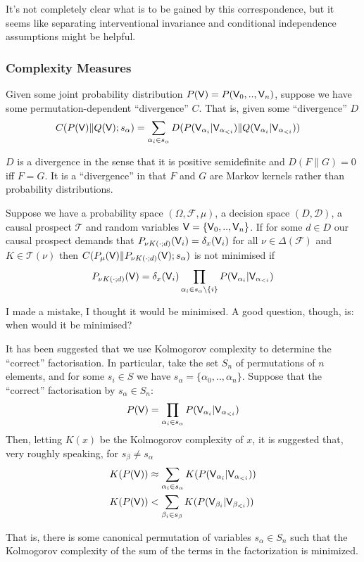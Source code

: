 It's not completely clear what is to be gained by this correspondence, but it seems like separating interventional invariance and conditional independence assumptions might be helpful.

\subsubsection{Complexity Measures}

Given some joint probability distribution $P(\mathsf{V})=P(\mathsf{V}_0,..,\mathsf{V}_n)$, suppose we have some permutation-dependent ``divergence'' $C$. That is, given some ``divergence'' $D$
\begin{align}
    C(P(\mathsf{V})\|Q(\mathsf{V});s_\alpha) &= \sum_{\alpha_i\in s_\alpha} D(P(\mathsf{V}_{\alpha_i}|\mathsf{V}_{\alpha_{<i}})\|Q(\mathsf{V}_{\alpha_i}|\mathsf{V}_{\alpha_{<i}}))
\end{align}

$D$ is a divergence in the sense that it is positive semidefinite and $D(F\|G)=0$ iff $F=G$. It is a ``divergence'' in that $F$ and $G$ are Markov kernels rather than probability distributions.

Suppose we have a probability space $(\Omega,\mathcal{F},\mu)$, a decision space $(D,\mathcal{D})$, a causal prospect $\mathscr{T}$ and random variables $\mathsf{V}=\{\mathsf{V}_0,..,\mathsf{V}_n\}$. If for some $d\in D$ our causal prospect demands that $P_{\nu K(\cdot;d)}(\mathsf{V}_i)=\delta_x(\mathsf{V}_i)$ for all $\nu\in \Delta(\mathcal{F})$ and $K\in \mathscr{T}(\nu)$ then $C(P_\mu(\mathsf{V})\|P_{\nu K(\cdot;d)}(\mathsf{V});s_\alpha)$ is not minimised if
\begin{align}
    P_{\nu K(\cdot;d)}(\mathsf{V}) = \delta_x(\mathsf{V}_i)\prod_{\alpha_i\in s_\alpha\setminus\{i\}} P(\mathsf{V}_{\alpha_i}|\mathsf{V}_{\alpha_{<i}})
\end{align}

I made a mistake, I thought it would be minimised. A good question, though, is: when would it be minimised?

It has been suggested that we use Kolmogorov complexity to determine the ``correct'' factorisation\cite{lemeire_replacing_2013}. In particular, take the set $S_n$ of permutations of $n$ elements, and for some $s_i\in S$ we have $s_\alpha = \{\alpha_0,..,\alpha_n\}$. Suppose that the ``correct'' factorisation by $s_\alpha \in S_n$:
\begin{align}
    P(\mathsf{V})=\prod_{\alpha_i\in s_\alpha} P(\mathsf{V}_{\alpha_i}|\mathsf{V}_{\alpha_{<i}})
\end{align}
Then, letting $K(x)$ be the Kolmogorov complexity of $x$, it is suggested that, very roughly speaking, for $s_\beta \neq s_\alpha$
\begin{align}
    K(P(\mathsf{V})) &\approx \sum_{\alpha_i\in s_\alpha} K(P(\mathsf{V}_{\alpha_i}|\mathsf{V}_{\alpha_{<i}})) \label{eq:complexity_equality}\\
    K(P(\mathsf{V})) &< \sum_{\beta_i\in s_\beta}K(P(\mathsf{V}_{\beta_i}|\mathsf{V}_{\beta_{<i}}))\label{eq:complexity_inequality}
\end{align}

That is, there is some canonical permutation of variables $s_\alpha \in S_n$ such that the Kolmogorov complexity of the sum of the terms in the factorization is minimized.

